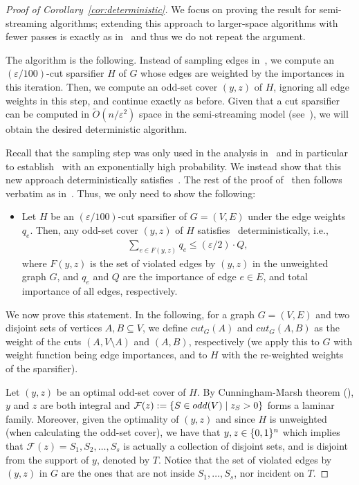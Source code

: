 \documentclass{article}
\renewcommand{\leq}{\leqslant}
\DeclarePairedDelimiter{\set}{\{}{\}}
\newcommand{\Ot}{\widetilde{O}}
\newcommand{\eps}{\varepsilon}
\begin{document}
\begin{proof}[Proof of Corollary~\ref{cor:deterministic}]
	We focus on proving the result for semi-streaming algorithms; extending this approach to larger-space algorithms with fewer passes is exactly as in~ and thus we do not repeat the argument. 
	
	The algorithm is the following. Instead of sampling edges in~, we compute an $(\eps/100)$-cut sparsifier $H$ of $G$ whose edges are weighted by the importances in this iteration. 
Then, we compute an odd-set cover $(y,z)$ of $H$, ignoring all edge weights in this step, and continue exactly as before. Given that a cut sparsifier can be computed in $\Ot(n/\eps^2)$ space in the semi-streaming model (see~\cite{McGregor14}), 
we will obtain the desired deterministic algorithm. 

Recall that the sampling step was only used in the analysis in~ and in particular to establish~ with an exponentially high probability. We instead show that this new approach
deterministically satisfies~. The rest of the proof of~ then follows verbatim as in~. Thus, 
we only need to show the following: 
\begin{itemize}
	\item Let $H$ be an $(\eps/100)$-cut sparsifier of $G=(V,E)$ under the edge weights $q_e$. Then, any odd-set cover $(y,z)$ of $H$ satisfies~ deterministically, i.e., 
	\begin{align}
		\sum_{e \in F(y,z)} q_e \leq (\eps/2) \cdot Q, \label{eq:not-hold}
	\end{align}
	where $F(y,z)$ is the set of violated edges by $(y,z)$ in the unweighted graph $G$, and $q_e$ and $Q$ are the importance of edge $e \in E$, and total importance of all edges, respectively. 
\end{itemize}
We now prove this statement. 
In the following, for a graph $G=(V,E)$ and two disjoint sets of vertices $A,B \subseteq V$, we define $cut_G(A)$ and $cut_G(A,B)$ 
as the weight of the cuts $(A, V \setminus A)$ and $(A,B)$, respectively (we apply this to $G$ with weight function being edge importances, and to $H$ with the re-weighted weights of the sparsifier).  

Let $(y,z)$ be an optimal odd-set cover of $H$. By Cunningham-Marsh theorem (), 
$y$ and $z$ are both integral and $\mathcal{F}(z) := \set{S \in odd(V) \mid z_S > 0}$ forms a laminar family. Moreover, given the optimality of $(y,z)$ and since $H$ is unweighted (when calculating the odd-set cover), 
we have that $y,z \in \set{0,1}^n$ which implies that $\mathcal{F}(z) = S_1,S_2,\ldots,S_s$ is actually a collection of disjoint sets, and is disjoint from the support of $y$, denoted by $T$. 
Notice that the set of violated edges by $(y,z)$ in $G$ are the ones
that are not inside $S_1,\ldots,S_s$, nor incident on $T$. 


\end{proof}
\end{document}

